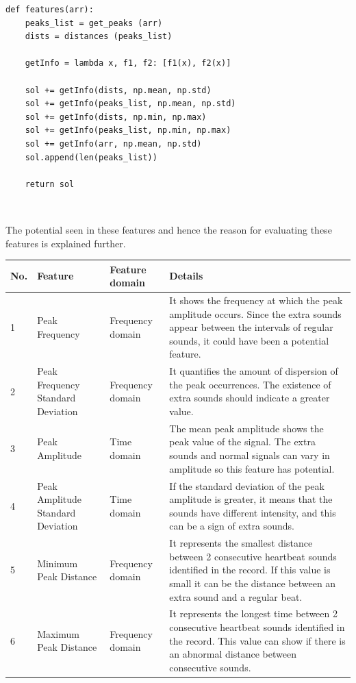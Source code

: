 \documentclass[11pt, a4papper]{report}
\theoremstyle{plain}
\theoremstyle{definition}
\theoremstyle{definition}
\theoremstyle{proposition}
\begin{document}
\begin{verbatim}
def features(arr):
	peaks_list = get_peaks (arr)
	dists = distances (peaks_list)
	
	getInfo = lambda x, f1, f2: [f1(x), f2(x)]
	
	sol += getInfo(dists, np.mean, np.std)
	sol += getInfo(peaks_list, np.mean, np.std)
	sol += getInfo(dists, np.min, np.max)
	sol += getInfo(peaks_list, np.min, np.max)
	sol += getInfo(arr, np.mean, np.std)
	sol.append(len(peaks_list))
	
	return sol
\end{verbatim}
\

The potential seen in these features and hence the reason for evaluating these features is explained further.
\\

\begin{longtable}[!h]{ | m{0.6cm} | m{3cm}| m{3.2cm} | m{6.5cm} | } 
\hline
No.& Feature & Feature domain & Details \\ 
\hline\hline
1 & Peak Frequency & Frequency domain & It shows the frequency at which the peak amplitude occurs. Since the extra sounds appear between the intervals of regular sounds, it could have been a potential feature. \\ 
\hline
2 & Peak Frequency Standard Deviation & Frequency domain \ & It quantifies the amount of dispersion of the peak occurrences. The existence of extra sounds should indicate a greater value. \\ 
\hline
3 & Peak Amplitude & Time domain &  The mean peak amplitude shows the peak value of the signal. The extra sounds and normal signals can vary in amplitude so this feature has potential. \\ 
\hline
4 & Peak Amplitude Standard Deviation & Time domain & If the standard deviation of the peak amplitude is greater, it means that the sounds have different intensity, and this can be a sign of extra sounds. \\ 
\hline
5 & Minimum Peak Distance & Frequency domain & It represents the smallest distance between 2 consecutive heartbeat sounds identified in the record. If this value is small it can be the distance between an extra sound and a regular beat. \\ 
\hline
6 & Maximum Peak Distance & Frequency domain & It represents the longest time between 2 consecutive heartbeat sounds identified in the record. This value can show if there is an abnormal distance between consecutive sounds.  \\ 

\end{longtable}
\end{document}
